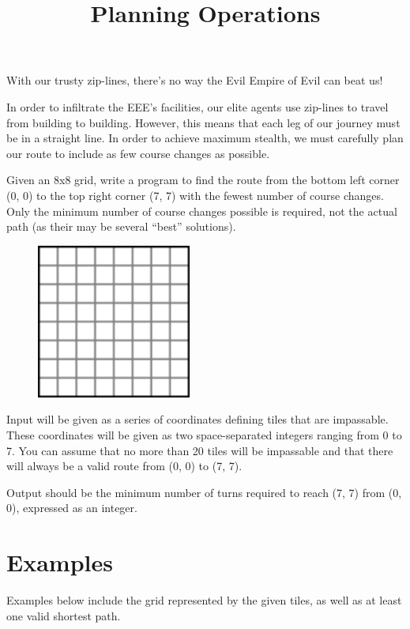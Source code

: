 \documentclass{../codeproblem}
\begin{document}
\title{Planning Operations}
\begin{flavor}
  With our trusty zip-lines, there's no way the Evil Empire of Evil can beat us!
\end{flavor}



In order to infiltrate the EEE's facilities, our elite agents use zip-lines to travel from building to building. However, this means that each leg of our journey must be in a straight line. In order to achieve maximum stealth, we must carefully plan our route to include as few course changes as possible.

Given an 8x8 grid, write a program to find the route from the bottom left corner (0, 0) to the top right corner (7, 7) with the fewest number of course changes. Only the minimum number of course changes possible is required, not the actual path (as their may be several ``best'' solutions).

\begin{figure}[h!]
  \centering
  \includegraphics[width=2.0in]{pics/emptygrid}
\end{figure}

Input will be given as a series of coordinates defining tiles that are impassable. These coordinates will be given as two space-separated integers ranging from 0 to 7. You can assume that no more than 20 tiles will be impassable and that there will always be a valid route from (0, 0) to (7, 7).

Output should be the minimum number of turns required to reach (7, 7) from (0, 0), expressed as an integer.

\section*{Examples}

Examples below include the grid represented by the given tiles, as well as at least one valid shortest path.
\end{document}
